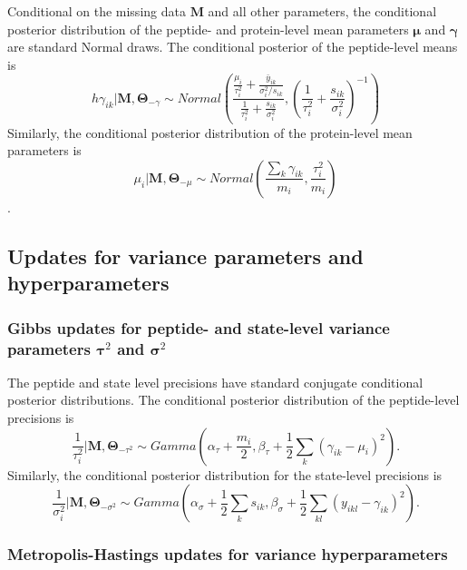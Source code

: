 Conditional on the missing data $\bm M$ and all other parameters, the conditional posterior distribution of the peptide- and protein-level mean parameters $\bm \mu$ and $\bm \gamma$ are standard Normal draws.
The conditional posterior of the peptide-level means is
\begin{equation*}h
\gamma_{ik} | \bm M, \bm \Theta_{-\gamma} \sim Normal\left(\frac{\frac{\mu_{i}}{\tau_{i}^{2}}+\frac{\bar{y}_{ik}}{\sigma_{i}^{2}/s_{ik}}}{\frac{1}{\tau_{i}^{2}}+\frac{s_{ik}}{\sigma_{i}^{2}}},\left(\frac{1}{\tau_{i}^{2}}+\frac{s_{ik}}{\sigma_{i}^{2}}\right)^{-1}\right)
\end{equation*}
Similarly, the conditional posterior distribution of the protein-level mean parameters is
\begin{equation*}
\mu_{i} | \bm M, \bm \Theta_{-\mu} \sim Normal\left(\frac{\sum_{k}\gamma_{ik}}{m_{i}},\frac{\tau_{i}^{2}}{m_{i}}\right)
\end{equation*}
. 

\subsection{Updates for variance parameters and hyperparameters}


\subsubsection{Gibbs updates for peptide- and state-level variance parameters $\bm \tau^2$ and $\bm \sigma^2$}

The peptide and state level precisions have standard conjugate conditional posterior distributions.
The conditional posterior distribution of the peptide-level precisions is 
\begin{equation*}
\frac{1}{\tau_{i}^{2}} | \bm M, \bm \Theta_{-\tau^2} \sim Gamma\left(\alpha_{\tau}+\frac{m_{i}}{2},\beta_{\tau}+\frac{1}{2}\sum_{k}(\gamma_{ik}-\mu_{i})^{2}\right) .
\end{equation*}
Similarly, the conditional posterior distribution for the state-level precisions is
\begin{equation*}
\frac{1}{\sigma_{i}^{2}} | \bm M, \bm \Theta_{-\sigma^2}  \sim Gamma\left(\alpha_{\sigma}+\frac{1}{2}\sum_{k}s_{ik},\beta_{\sigma}+\frac{1}{2}\sum_{kl}(y_{ikl}-\gamma_{ik})^{2}\right) .
\end{equation*}

\subsubsection{Metropolis-Hastings updates for variance hyperparameters}
\label{supp:proteomics:sec:var_hyperparam_updates}

